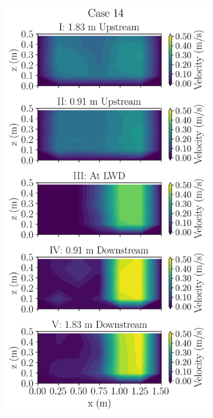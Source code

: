 \documentclass[preview, border=2pt]{standalone}
\begin{document}
\begin{figure}
\begin{subfigure}[b]{0.24\textwidth}
     \end{subfigure}
     \hfill     
     \begin{subfigure}[b]{0.24\textwidth}
         \centering
         \caption{}
         \includegraphics[width=\textwidth]{Case14_velocity_contours.png}
     \end{subfigure}
\end{figure}
\end{document}
